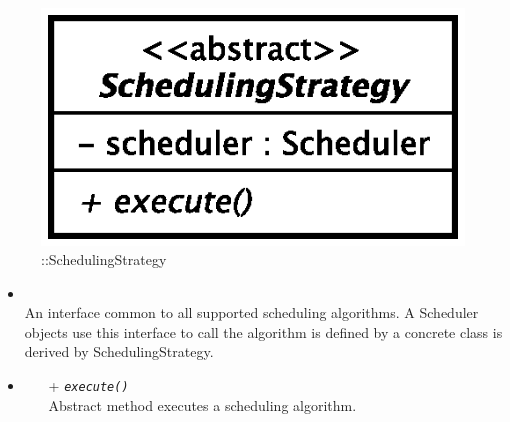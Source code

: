 \begin{figure}[h]
\centering
\includegraphics[scale=0.6,keepaspectratio]{images/solution/app/backend/scheduling_strategy.eps}
\caption{\pScheduling::SchedulingStrategy}
\label{fig:sd-app-scheduling-scheduling-strategy}
\end{figure}
\FloatBarrier
\begin{itemize}
  \item \textbf{\descr} \\
    An interface common to all supported scheduling algorithms. 
    A Scheduler objects use this interface to call the algorithm 
    is defined by a concrete class is derived by SchedulingStrategy.
  \item \textbf{\ops}
  \begin{itemize}
    \item[+] \texttt{\textit{execute()}} \\
Abstract method executes a scheduling algorithm.
  \end{itemize}
\end{itemize}
